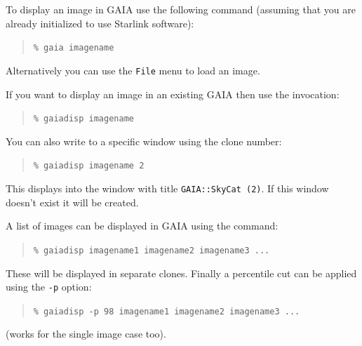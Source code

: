 \documentclass[twoside,11pt]{article}
\newcommand{\xlabel}[1]{}
\renewcommand{\_}{\texttt{\symbol{95}}}
\newcommand{\mytt}[1]{{\texttt{#1}}}
\begin{document}
To display an image in GAIA use the following command
(assuming that you are already initialized to use Starlink software):
\begin{quote}
\mytt{\% gaia image\_name}
\end{quote}
Alternatively you can use the \mytt{File} menu to load an image.

If you want to display an image in an existing GAIA then use the
invocation:
\begin{quote}
\mytt{\% gaiadisp image\_name}
\end{quote}
You can also write to a specific window using the clone number:
\begin{quote}
\mytt{\% gaiadisp image\_name 2}
\end{quote}
This displays into the window with title \mytt{GAIA::SkyCat (2)}. 
If this window doesn't exist it will be created.

A list of images can be displayed in GAIA using the command:
\begin{quote}
\mytt{\% gaiadisp image\_name1 image\_name2 image\_name3 ...}
\end{quote}
These will be displayed in separate clones. Finally a percentile cut
can be applied using the \mytt{-p} option:
\begin{quote}
\mytt{\% gaiadisp -p 98 image\_name1 image\_name2 image\_name3 ...}
\end{quote}
(works for the single image case too).


\end{document}
